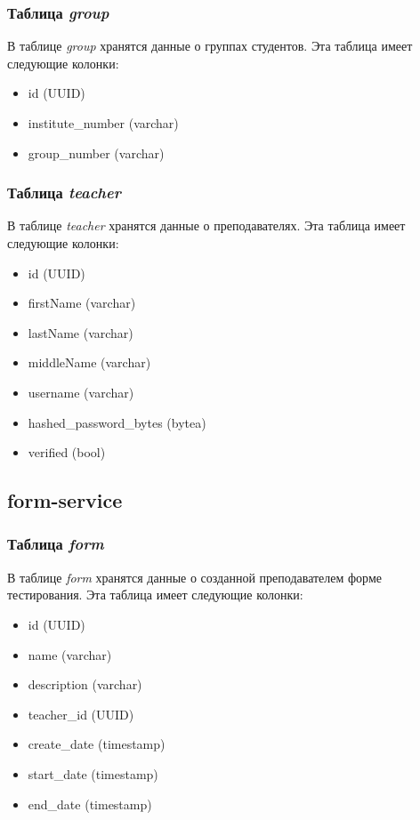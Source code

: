 \documentclass[4paper,12pt]{article}
\begin{document}
	\subsubsection{Таблица \textit{group}}
	В таблице \textit{group} хранятся данные о группах студентов. Эта таблица имеет следующие колонки:
	\begin{itemize}
		\item id (UUID)
		\item institute\_number (varchar) %
		\item group\_number (varchar) %
	\end{itemize}
	
	\subsubsection{Таблица \textit{teacher}}
	В таблице \textit{teacher} хранятся данные о преподавателях. Эта таблица имеет следующие колонки:
	\begin{itemize}
		\item id (UUID)
		\item firstName (varchar)
		\item lastName (varchar)
		\item middleName (varchar)
		\item username (varchar)
		\item hashed\_password\_bytes (bytea)
		\item verified (bool)
	\end{itemize}
	
	\subsection{form-service}
	\subsubsection{Таблица \textit{form}}
	В таблице \textit{form} хранятся данные о созданной преподавателем форме тестирования. Эта таблица имеет следующие колонки:
	\begin{itemize}
		\item id (UUID)
		\item name (varchar)
		\item description (varchar)
		\item teacher\_id (UUID)
		\item create\_date (timestamp)
		\item start\_date (timestamp)
		\item end\_date (timestamp)
	\end{itemize}
	
\end{document}
